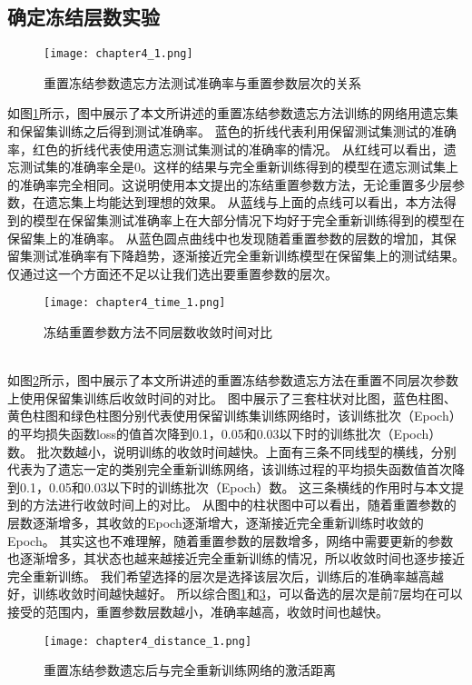 \subsection{确定冻结层数实验}
\begin{figure}
    \centering
    \texttt{[image: chapter4\_1.png]}
    \caption{重置冻结参数遗忘方法测试准确率与重置参数层次的关系}
    \label{fig:chapter4_1}
\end{figure}
如图\ref{fig:chapter4_1}所示，图中展示了本文所讲述的重置冻结参数遗忘方法训练的网络用遗忘集和保留集训练之后得到测试准确率。
蓝色的折线代表利用保留测试集测试的准确率，红色的折线代表使用遗忘测试集测试的准确率的情况。
从红线可以看出，遗忘测试集的准确率全是0。这样的结果与完全重新训练得到的模型在遗忘测试集上的准确率完全相同。这说明使用本文提出的冻结重置参数方法，无论重置多少层参数，在遗忘集上均能达到理想的效果。
从蓝线与上面的点线可以看出，本方法得到的模型在保留集测试准确率上在大部分情况下均好于完全重新训练得到的模型在保留集上的准确率。
从蓝色圆点曲线中也发现随着重置参数的层数的增加，其保留集测试准确率有下降趋势，逐渐接近完全重新训练模型在保留集上的测试结果。
仅通过这一个方面还不足以让我们选出要重置参数的层次。
\begin{figure}
    \centering
    \texttt{[image: chapter4\_time\_1.png]}
    \caption{冻结重置参数方法不同层数收敛时间对比}
    \label{fig:chapter4_time_1}
\end{figure}
\\    如图\ref{fig:chapter4_time_1}所示，图中展示了本文所讲述的重置冻结参数遗忘方法在重置不同层次参数上使用保留集训练后收敛时间的对比。
图中展示了三套柱状对比图，蓝色柱图、黄色柱图和绿色柱图分别代表使用保留训练集训练网络时，该训练批次（Epoch）的平均损失函数loss的值首次降到0.1，0.05和0.03以下时的训练批次（Epoch）数。
批次数越小，说明训练的收敛时间越快。上面有三条不同线型的横线，分别代表为了遗忘一定的类别完全重新训练网络，该训练过程的平均损失函数值首次降到0.1，0.05和0.03以下时的训练批次（Epoch）数。
这三条横线的作用时与本文提到的方法进行收敛时间上的对比。
从图中的柱状图中可以看出，随着重置参数的层数逐渐增多，其收敛的Epoch逐渐增大，逐渐接近完全重新训练时收敛的Epoch。
其实这也不难理解，随着重置参数的层数增多，网络中需要更新的参数也逐渐增多，其状态也越来越接近完全重新训练的情况，所以收敛时间也逐步接近完全重新训练。
我们希望选择的层次是选择该层次后，训练后的准确率越高越好，训练收敛时间越快越好。
所以综合图\ref{fig:chapter4_1}和\ref{fig:chapter4_distance_1}，可以备选的层次是前7层均在可以接受的范围内，重置参数层数越小，准确率越高，收敛时间也越快。
\begin{figure}
    \centering
    \texttt{[image: chapter4\_distance\_1.png]}
    \caption{重置冻结参数遗忘后与完全重新训练网络的激活距离}
    \label{fig:chapter4_distance_1}
\end{figure}
